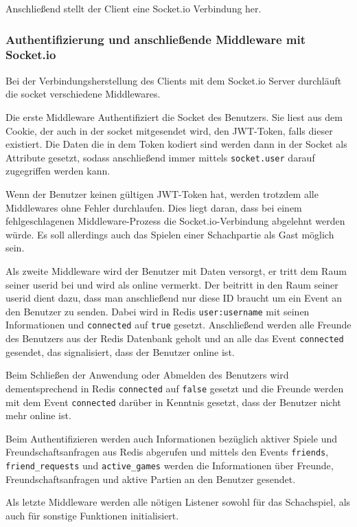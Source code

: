 Anschließend stellt der Client eine Socket.io Verbindung her.

\subsubsection{Authentifizierung und anschließende Middleware mit Socket.io}
\label{sec:socketauth}
Bei der Verbindungsherstellung des Clients mit dem Socket.io Server durchläuft die socket verschiedene Middlewares.

Die erste Middleware Authentifiziert die Socket des Benutzers. Sie liest aus dem Cookie, der auch in der socket mitgesendet wird, den JWT-Token, falls dieser existiert. Die Daten die in dem Token kodiert sind werden dann in der Socket als Attribute gesetzt, sodass anschließend immer mittels \verb|socket.user| darauf zugegriffen werden kann.

Wenn der Benutzer keinen gültigen JWT-Token hat, werden trotzdem alle Middlewares ohne Fehler durchlaufen. Dies liegt daran, dass bei einem fehlgeschlagenen Middleware-Prozess die Socket.io-Verbindung abgelehnt werden würde. Es soll allerdings auch das Spielen einer Schachpartie als Gast möglich sein.

Als zweite Middleware wird der Benutzer mit Daten versorgt, er tritt dem Raum seiner userid bei und wird als online vermerkt.
Der beitritt in den Raum seiner userid dient dazu, dass man anschließend nur diese ID braucht um ein Event an den Benutzer zu senden. Dabei wird in Redis \verb|user:username| mit seinen Informationen und \verb|connected| auf \verb|true| gesetzt. Anschließend werden alle Freunde des Benutzers aus der Redis Datenbank geholt und an alle das Event \verb|connected| gesendet, das signalisiert, dass der Benutzer online ist.

Beim Schließen der Anwendung oder Abmelden des Benutzers wird dementsprechend in Redis \verb|connected| auf \verb|false| gesetzt und die Freunde werden mit dem Event \verb|connected| darüber in Kenntnis gesetzt, dass der Benutzer nicht mehr online ist.

Beim Authentifizieren werden auch Informationen bezüglich aktiver Spiele und Freundschaftsanfragen aus Redis abgerufen und mittels den Events \verb|friends|, \verb|friend_requests| und \verb|active_games| werden die Informationen über Freunde, Freundschaftsanfragen und aktive Partien an den Benutzer gesendet.

Als letzte Middleware werden alle nötigen Listener sowohl für das Schachspiel, als auch für sonstige Funktionen initialisiert.

